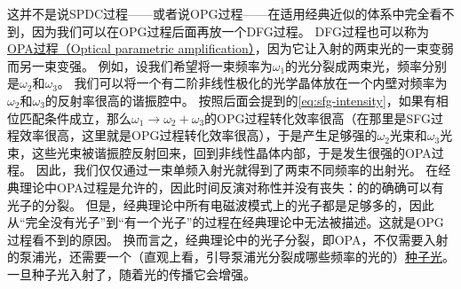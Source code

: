 \documentclass[UTF8, a4paper]{ctexart}
\newcommand{\concept}[1]{\underline{#1}}
\begin{document}
这并不是说SPDC过程——或者说OPG过程——在适用经典近似的体系中完全看不到，因为我们可以在OPG过程后面再放一个DFG过程。
DFG过程也可以称为\concept{OPA过程（Optical parametric amplification）}，因为它让入射的两束光的一束变弱而另一束变强。
例如，设我们希望将一束频率为$\omega_1$的光分裂成两束光，频率分别是$\omega_2$和$\omega_3$。
我们可以将一个有二阶非线性极化的光学晶体放在一个内壁对频率为$\omega_2$和$\omega_3$的反射率很高的谐振腔中。
按照后面会提到的\eqref{eq:sfg-intensity}，如果有相位匹配条件成立，那么$\omega_1 \to \omega_2 + \omega_3$的OPG过程转化效率很高（在那里是SFG过程效率很高，这里就是OPG过程转化效率很高），于是产生足够强的$\omega_2$光束和$\omega_3$光束，这些光束被谐振腔反射回来，回到非线性晶体内部，于是发生很强的OPA过程。
因此，我们仅仅通过一束单频入射光就得到了两束不同频率的出射光。
在经典理论中OPA过程是允许的，因此时间反演对称性并没有丧失：的的确确可以有光子的分裂。
但是，经典理论中所有电磁波模式上的光子都是足够多的，因此从“完全没有光子”到“有一个光子”的过程在经典理论中无法被描述。这就是OPG过程看不到的原因。
换而言之，经典理论中的光子分裂，即OPA，不仅需要入射的泵浦光，还需要一个（直观上看，引导泵浦光分裂成哪些频率的光的）\concept{种子光}。
一旦种子光入射了，随着光的传播它会增强。
\end{document}
